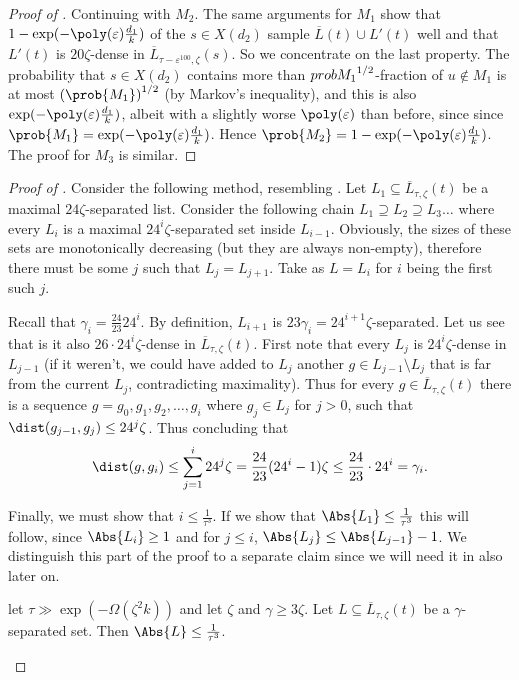 \begin{proof}[Proof of ]
    Continuing with \(M_2\). The same arguments for \(M_1\) show that \(1-\exp(-\poly(\varepsilon)\frac{d_1}{k})\) of the \(s \in X(d_2)\) sample \(\overline{L}(t)\cup L'(t)\) well and that \(L'(t)\) is \(20\zeta\)-dense in \(\overline{L}_{\tau-\varepsilon^{100},\zeta}(s)\). So we concentrate on the last property. The probability that \(s \in X(d_2)\) contains more than \(\\prob{M_1}^{1/2}\)-fraction of \(u \notin M_1\) is at most \(\left ( \prob{M_1} \right )^{1/2}\) (by Markov's inequality), and this is also \(\exp(-\poly(\varepsilon)\frac{d_1}{k})\), albeit with a slightly worse \(\poly(\varepsilon)\) than before, since since \(\prob{M_1}=\exp(-\poly(\varepsilon)\frac{d_1}{k})\). Hence \(\prob{M_2} =1-\exp(-\poly(\varepsilon)\frac{d_1}{k})\). The proof for \(M_3\) is similar.
\end{proof}

\begin{proof}[Proof of ]
    Consider the following method, resembling \cite{DinurHKLT2018}. Let \(L_1 \subseteq \overline{L}_{\tau,\zeta}(t)\) be a maximal \(24\zeta\)-separated list. Consider the following chain \(L_1 \supseteq L_2 \supseteq L_3 \dots\) where every \(L_i\) is a maximal \(24^i \zeta\)-separated set inside \(L_{i-1}\). Obviously, the sizes of these sets are monotonically decreasing (but they are always non-empty), therefore there must be some \(j\) such that \(L_j = L_{j+1}\). Take as \(L=L_i\) for \(i\) being the first such \(j\).

    Recall that \(\gamma_i = \frac{24}{23} 24^i\). By definition, \(L_{i+1}\) is \(23\gamma_i = 24^{i+1}\zeta\)-separated. Let us see that is it also \(26\cdot 24^i \zeta\)-dense in \(\overline{L}_{\tau,\zeta}(t)\). First note that every \(L_j\) is \(24^i \zeta\)-dense in \(L_{j-1}\) (if it weren't, we could have added to \(L_j\) another \(g \in L_{j-1}\setminus L_j\) that is far from the current \(L_j\), contradicting maximality). Thus for every \(g \in \overline{L}_{\tau,\zeta}(t)\) there is a sequence \(g=g_0,g_1,g_2,\dots, g_i\) where \(g_j \in L_j\) for \(j>0\), such that \(\dist(g_{j-1},g_j)\leq 24^j \zeta\). Thus concluding that
    \[\dist(g,g_i) \leq \sum_{j=1}^i 24^j  \zeta = \frac{24}{23}(24^i-1)\zeta \leq \frac{24}{23} \cdot 24^i = \gamma_i.\]

    Finally, we must show that \(i \leq \frac{1}{\tau^3}\). If we show that \(\Abs{L_1} \leq \frac{1}{\tau^3}\) this will follow, since \(\Abs{L_i}\geq 1\) and for \(j \leq i\), \(\Abs{L_j}\leq \Abs{L_{j-1}}-1\). We distinguish this part of the proof to a separate claim since we will need it in also later on.
    \begin{claim} \label{claim:lists-are-short}
        let \(\tau \gg \exp(-\Omega(\zeta^2 k))\) and let \(\zeta\) and \(\gamma \geq 3\zeta\). Let \(L \subseteq \overline{L}_{\tau,\zeta}(t)\) be a \(\gamma\)-separated set. Then \(\Abs{L}\leq\frac{1}{\tau^3}\).
    \end{claim}
\end{proof}

